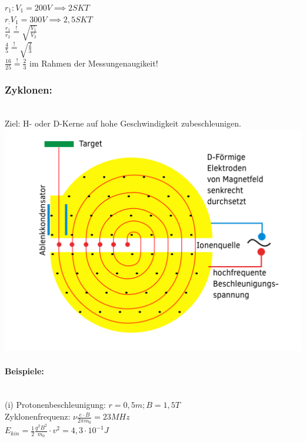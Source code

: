   $r_1: V_1=200V\implies 2SKT$\\
  
  $r_: V_1=300V\implies 2,5SKT$\\
  
  $\frac{r_1}{r_2}\overset{!}{=} \sqrt{\frac{V_1}{V_2}}$\\
  
  $\frac{4}{5}\overset{!}{=}\sqrt{\frac{2}{3}}$\\
  
  $\frac{16}{25}\overset{!}{=}\frac{2}{3}$ \checkmark im Rahmen der Messungenaugikeit!
  
  \subsubsection{Zyklonen:}\leavevmode \\
  Ziel: H- oder D-Kerne auf hohe Geschwindigkeit zubeschleunigen.\\
  
  \includegraphics{skizzen/16/16_1B03}\\
  
  \paragraph{Beispiele:}\leavevmode \\
  (i) Protonenbeschleunigung: $r=0,5m; B=1,5T$\\
  Zyklonenfrequenz: $\nu\frac{e\cdot B}{2\pi m_0}=23MHz$\\
  
  $E_{kin}=\frac{1}{2}\frac{q^2 B^2}{m_0}\cdot v^2=4,3\cdot 10^{-1}J$\\
  
